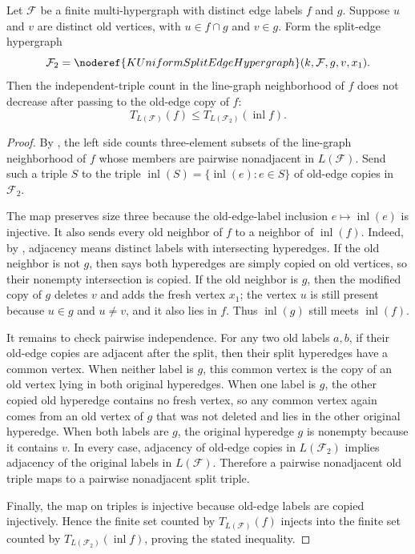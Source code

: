 \begin{helper}
Let $\mathcal F$ be a finite multi-hypergraph with distinct edge labels
$f$ and $g$.  Suppose $u$ and $v$ are distinct old vertices, with
$u\in f\cap g$ and $v\in g$.  Form the split-edge hypergraph
\[
\mathcal F_2=\noderef{KUniformSplitEdgeHypergraph}(k,\mathcal F,g,v,x_1).
\]
Then the independent-triple count in the line-graph neighborhood of $f$
does not decrease after passing to the old-edge copy of $f$:
\[
T_{L(\mathcal F)}(f)
\le
T_{L(\mathcal F_2)}(\operatorname{inl} f).
\]
\end{helper}
\begin{proof}
By , the left side counts three-element
subsets of the line-graph neighborhood of $f$ whose members are pairwise
nonadjacent in \(L(\mathcal F)\).  Send such a triple \(S\) to the triple
\(\operatorname{inl}(S)=\{\operatorname{inl}(e):e\in S\}\) of old-edge
copies in \(\mathcal F_2\).

The map preserves size three because the old-edge-label inclusion
\(e\mapsto \operatorname{inl}(e)\) is injective.  It also sends every old
neighbor of \(f\) to a neighbor of \(\operatorname{inl}(f)\).  Indeed, by
, adjacency means distinct labels with
intersecting hyperedges.  If the old neighbor is not \(g\), then
 says both hyperedges are simply copied
on old vertices, so their nonempty intersection is copied.  If the old
neighbor is \(g\), then the modified copy of \(g\) deletes \(v\) and adds the
fresh vertex \(x_1\); the vertex \(u\) is still present because \(u\in g\)
and \(u\ne v\), and it also lies in \(f\).  Thus \(\operatorname{inl}(g)\)
still meets \(\operatorname{inl}(f)\).

It remains to check pairwise independence.  For any two old labels \(a,b\),
if their old-edge copies are adjacent after the split, then their split
hyperedges have a common vertex.  When neither label is \(g\), this common
vertex is the copy of an old vertex lying in both original hyperedges.  When
one label is \(g\), the other copied old hyperedge contains no fresh vertex,
so any common vertex again comes from an old vertex of \(g\) that was not
deleted and lies in the other original hyperedge.  When both labels are
\(g\), the original hyperedge \(g\) is nonempty because it contains \(v\).
In every case, adjacency of old-edge copies in \(L(\mathcal F_2)\) implies
adjacency of the original labels in \(L(\mathcal F)\).  Therefore a pairwise
nonadjacent old triple maps to a pairwise nonadjacent split triple.

Finally, the map on triples is injective because old-edge labels are copied
injectively.  Hence the finite set counted by
\(T_{L(\mathcal F)}(f)\) injects into the finite set counted by
\(T_{L(\mathcal F_2)}(\operatorname{inl} f)\), proving the stated
inequality.
\end{proof}
